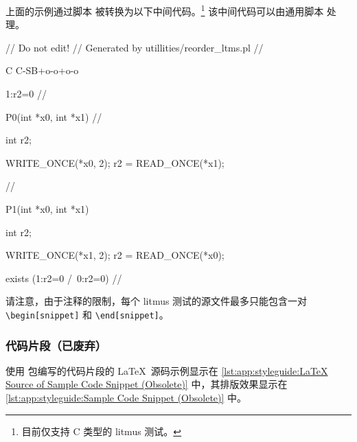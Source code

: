 上面的示例通过脚本 
被转换为以下中间代码。\footnote{
	目前仅支持 C 类型的 litmus 测试。
}
该中间代码可以由通用脚本  处理。

\begin{fcvlabel}
\begin{VerbatimN}[tabsize=8]
// Do not edit!
// Generated by utillities/reorder_ltms.pl
//\begin{snippet}[labelbase=ln:base,commandchars=\%\@\$]
C C-SB+o-o+o-o

{
1:r2=0			//
}

P0(int *x0, int *x1)		//
{
	int r2;

	WRITE_ONCE(*x0, 2);
	r2 = READ_ONCE(*x1);
}				//

P1(int *x0, int *x1)
{
	int r2;

	WRITE_ONCE(*x1, 2);
	r2 = READ_ONCE(*x0);
}

exists (1:r2=0 /\ 0:r2=0)  
//\end{snippet}
\end{VerbatimN}
\end{fcvlabel}

请注意，由于注释的限制，每个 litmus 测试的源文件最多只能包含一对
\texttt{\textbackslash begin[snippet]} 和 \texttt{\textbackslash end[snippet]}。

\subsubsection{代码片段（已废弃）}
\label{sec:app:styleguide:Code Snippet (Obsolete)}

使用  包编写的代码片段的
\LaTeX\ 源码示例显示在
\cref{lst:app:styleguide:LaTeX Source of Sample Code Snippet (Obsolete)}
中，其排版效果显示在
\cref{lst:app:styleguide:Sample Code Snippet (Obsolete)} 中。

\begin{listing}
\begin{fcvlabel}
\end{fcvlabel}
\vspace*{-9pt}
\caption{示例代码片段的 \LaTeX\ 源码（已废弃）}
\label{lst:app:styleguide:LaTeX Source of Sample Code Snippet (Obsolete)}
\end{listing}

